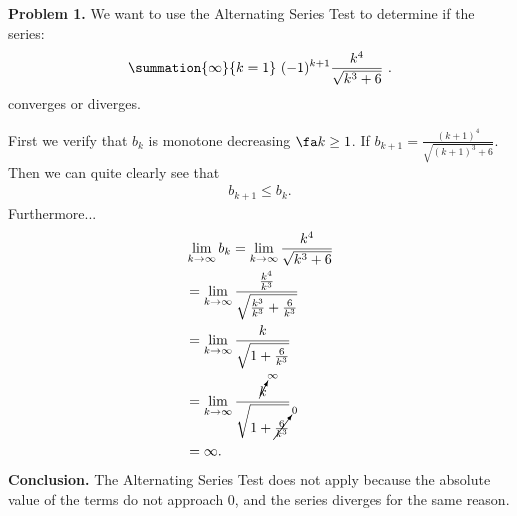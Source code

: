 \documentclass{report}
\begin{document}
    \bigbreak \noindent 
    \begin{mdframed}
        \textbf{Problem 1.} We want to use the Alternating Series Test to determine if the series:
        \begin{align*}
            \summation{\infty}{k=1}\ (-1)^{k+1} \frac{k^{4}}{\sqrt{k^{3} +6}}\ 
        .\end{align*}
        converges or diverges.
    \end{mdframed}
    \bigbreak \noindent 
    First we verify that $b_{k}$ is monotone decreasing $\fa k \geq 1$. If $b_{k+1} = \frac{(k+1)^{4}}{\sqrt{(k+1)^{3} + 6}}$. Then we can quite clearly see that
    \begin{align*}
        b_{k+1} \leq b_{k}     
    .\end{align*}
    Furthermore...
    \begin{align*}
        &\lim\limits_{k \to \infty}{b_{k}} = \lim\limits_{k \to \infty}{\frac{k^{4}}{\sqrt{k^{3}  + 6}}} \\
        &=\lim\limits_{k \to \infty}{\frac{\frac{k^{4}}{k^{3}}}{\sqrt{\frac{k^{3}}{k^{3}}+\frac{6}{k^{3}}}}} \\
        &= \lim\limits_{k \to \infty}{\frac{k}{\sqrt{1+\frac{6}{k^{3}}}}} \\
        &= \lim\limits_{k \to \infty}{\frac{\cancelto{\infty}{k}}{\sqrt{1+\cancelto{0}{\frac{6}{k^{3}}}}}} \\
        &=\infty
    .\end{align*}
    \textbf{Conclusion.} The Alternating Series Test does not apply because the absolute value of the terms do not approach 0, and the series diverges for the same reason.
\end{document}
